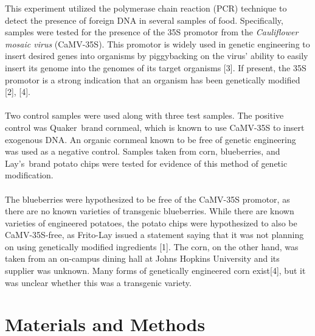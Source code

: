 \documentclass{article}
\begin{document}
This experiment utilized the polymerase chain reaction (PCR) technique to detect the presence of foreign DNA in several samples of food. Specifically, samples were tested for the presence of the 35S promotor from the \textit{Cauliflower mosaic virus} (CaMV-35S). This promotor is widely used in genetic engineering to insert desired genes into organisms by piggybacking on the virus' ability to easily insert its genome into the genomes of its target organisms [3]. If present, the 35S promotor is a strong indication that an organism has been genetically modified [2], [4]. \\
\\
Two control samples were used along with three test samples. The positive control was Quaker\texttrademark \ brand cornmeal, which is known to use CaMV-35S to insert exogenous DNA. An organic cornmeal known to be free of genetic engineering was used as a negative control. Samples taken from corn, blueberries, and Lay's\texttrademark \ brand potato chips were tested for evidence of this method of genetic modification. \\
\\
The blueberries were hypothesized to be free of the CaMV-35S promotor, as there are no known varieties of transgenic blueberries. While there are known varieties of engineered potatoes, the potato chips were hypothesized to also be CaMV-35S-free, as Frito-Lay issued a statement saying that it was not planning on using genetically modified ingredients [1]. The corn, on the other hand, was taken from an on-campus dining hall at Johns Hopkins University and its supplier was unknown. Many forms of genetically engineered corn exist[4], but it was unclear whether this was a transgenic variety. 


\section{Materials and Methods}
\end{document}
